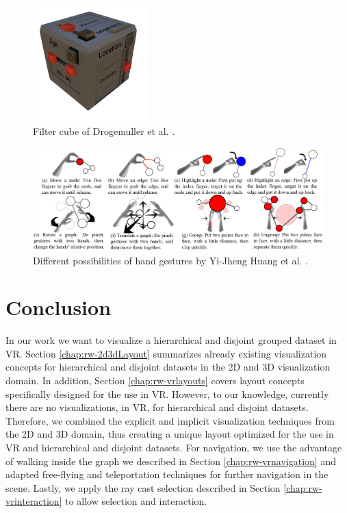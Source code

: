 \begin{figure}[h]
    \centering
    \includegraphics[width=0.4\textwidth]{graphics/filterCube.jpg}
    \caption{Filter cube of Drogemuller et al. \cite{drogemuller_vrige_2017}.} 
    \label{fig:vrFilterCube} 
\end{figure}

\begin{figure}[h]
    \centering
    \includegraphics[width=1\textwidth]{graphics/handGestures.jpg}
    \caption{Different possibilities of hand gestures by Yi-Jheng Huang et al. \cite{yi-jheng_huang_gesture_2017}.} 
    \label{fig:vrHandGestures} 
\end{figure}

\section{Conclusion}

In our work we want to visualize a hierarchical and disjoint grouped dataset in VR.
Section \ref{chap:rw-2d3dLayout} summarizes already existing visualization concepts for hierarchical and disjoint datasets in the 2D and 3D visualization domain. 
In addition, Section \ref{chap:rw-vrlayouts} covers layout concepts specifically designed for the use in VR. However, to our knowledge, currently there are no visualizations, in VR, for hierarchical and disjoint datasets.
Therefore, we combined the explicit and implicit visualization techniques from the 2D and 3D domain, thus creating a unique layout optimized for the use in VR and hierarchical and disjoint datasets.
For navigation, we use the advantage of walking inside the graph we described in Section \ref{chap:rw-vrnavigation} and adapted free-flying and teleportation techniques for further navigation in the scene. Lastly, we apply the ray cast selection described in Section \ref{chap:rw-vrinteraction} to allow selection and interaction.  